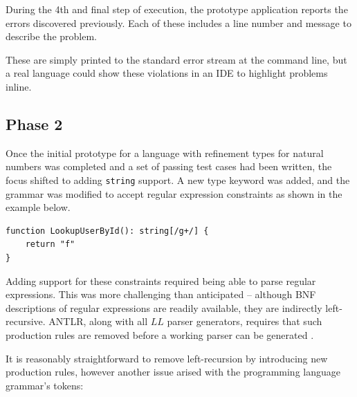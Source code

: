 \documentclass[a4paper]{article}
\begin{document}
    \hfill{}

    During the 4th and final step of execution, the prototype application reports the errors discovered previously. Each of these includes a line number and message to describe the problem.
    
    These are simply printed to the standard error stream at the command line, but a real language could show these violations in an IDE to highlight problems inline.

\subsection*{Phase 2}\hfill

Once the initial prototype for a language with refinement types for natural numbers was completed and a set of passing test cases had been written, the focus shifted to adding \texttt{string} support. A new type keyword was added, and the grammar was modified to accept regular expression constraints as shown in the example below.

\begin{verbatim}
function LookupUserById(): string[/g+/] {
    return "f"
}
\end{verbatim}

Adding support for these constraints required being able to parse regular expressions. This was more challenging than anticipated -- although BNF descriptions of regular expressions are readily available, they are indirectly left-recursive. ANTLR, along with all $LL$ parser generators, requires that such production rules are removed before a working parser can be generated \citep{dick1990parsing}.

It is reasonably straightforward to remove left-recursion by introducing new production rules, however another issue arised with the programming language grammar's tokens:
\end{document}
